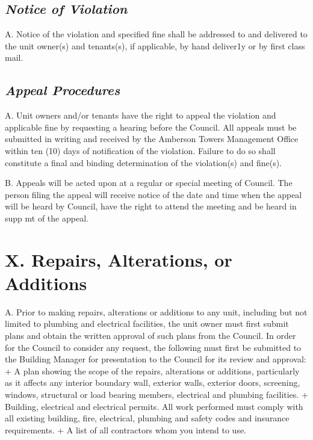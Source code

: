 \documentclass[
  14pt,
]{book}
\begin{document}
\hypertarget{notice-of-violation}{%
\subsection*{\texorpdfstring{\emph{Notice of Violation}}{Notice of Violation}}\label{notice-of-violation}}

A. Notice of the violation and specified fine shall be addressed to and delivered to the unit owner(s) and tenants(s), if applicable, by hand deliver1y or by first class mail.

\hypertarget{appeal-procedures}{%
\subsection*{\texorpdfstring{\emph{Appeal Procedures}}{Appeal Procedures}}\label{appeal-procedures}}

A. Unit owners and/or tenants have the right to appeal the violation and applicable fine by requesting a hearing before the Council. All appeals must be submitted in writing and received by the Amberson Towers Management Office within ten (10) days of notification of the violation. Failure to do so shall constitute a final and binding determination of the violation(s) and fine(s).

B. Appeals will be acted upon at a regular or special meeting of Council. The person filing the appeal will receive notice of the date and time when the appeal will be heard by Council, have the right to attend the meeting and be heard in supp mt of the appeal.

\hypertarget{x.-repairs-alterations-or-additions}{%
\section*{X. Repairs, Alterations, or Additions}\label{x.-repairs-alterations-or-additions}}

A. Prior to making repairs, alterations or additions to any unit, including but not limited to plumbing and electrical facilities, the unit owner must first submit plans and obtain the written approval of such plans from the Council. In order for the Council to consider any request, the following must first be submitted to the Building Manager for presentation to the Council for its review and approval: + A plan showing the scope of the repairs, alterations or additions, particularly as it affects any interior boundary wall, exterior walls, exterior doors, screening, windows, structural or load bearing members, electrical and plumbing facilities. + Building, electrical and electrical permits. All work performed must comply with all existing building, fire, electrical, plumbing and safety codes and insurance requirements. + A list of all contractors whom you intend to use.
\end{document}
